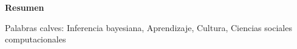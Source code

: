 \documentclass[a4paper,10pt]{book}
\theoremstyle{definition}1
\begin{document}
\hspace{2cm}

\begin{center}
\textbf{Resumen}
\end{center}




\vspace{0.3cm}

\noindent Palabras calves: Inferencia bayesiana, Aprendizaje, Cultura, Ciencias sociales computacionales




\tableofcontents

\newpage 

\vfill
% 
% 
% 
% 
\end{document}
